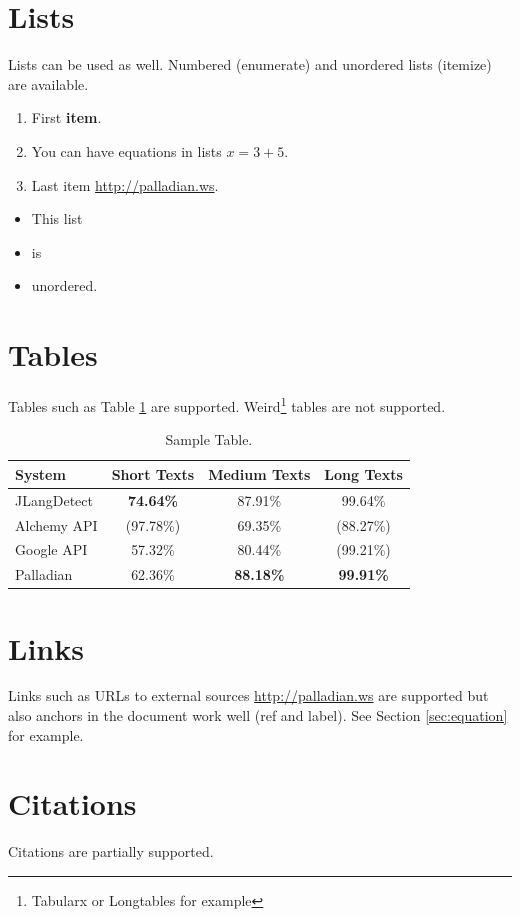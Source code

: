 \documentclass[a4paper,twoside]{book}      %
\begin{document}
\section{Lists}
Lists can be used as well. Numbered (enumerate) and unordered lists (itemize) are available.

\begin{enumerate}
\item First \textbf{item}.
\item You can have equations in lists $x = 3 + 5$.
\item Last item \url{http://palladian.ws}.
\end{enumerate} 

\begin{itemize}
\item This list
\item is
\item unordered.
\end{itemize} 

\section{Tables}
Tables such as Table \ref{tab:sampleTable} are supported. Weird\footnote{Tabularx or Longtables for example} tables are not supported.

\begin{table}
\centering
\begin{tabular}{|l|c|c|c|}
	\hline
	System & Short Texts & Medium Texts & Long Texts \\ 
	\hline
	JLangDetect & \textbf{74.64\%} & 87.91\% & 99.64\% \\ 
	\hline
	Alchemy API & (97.78\%) & 69.35\% & (88.27\%) \\ 
	\hline
	Google API & 57.32\% & 80.44\% & (99.21\%) \\ 
	\hline
	Palladian & 62.36\% & \textbf{88.18\%} & \textbf{99.91\%}  \\ 
	\hline
\end{tabular}
\caption{Sample Table.}
\label{tab:sampleTable}
\end{table}

\section{Links}
Links such as URLs to external sources \url{http://palladian.ws} are supported but also anchors in the document work well (ref and label). See Section \ref{sec:equation} for example.

\section{Citations}
Citations \cite{palladian2012} are partially supported.
\end{document}
